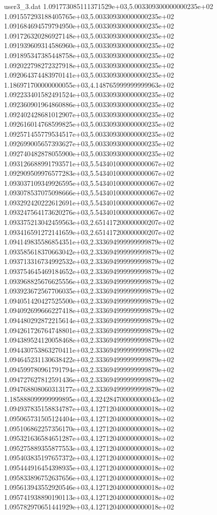 \begin{filecontents}{user3_3.dat}
1.091773085111371529e+03,5.003309300000000235e+02
1.091557293188405765e+03,5.003309300000000235e+02
1.091684694579794950e+03,5.003309300000000235e+02
1.091726320286927148e+03,5.003309300000000235e+02
1.091939609314586960e+03,5.003309300000000235e+02
1.091895347385448758e+03,5.003309300000000235e+02
1.092022798272327918e+03,5.003309300000000235e+02
1.092064374483970141e+03,5.003309300000000235e+02
1.186971700000000055e+03,4.148765999999999963e+02
1.092233401582491524e+03,5.003309300000000235e+02
1.092360901964860886e+03,5.003309300000000235e+02
1.092402428681012907e+03,5.003309300000000235e+02
1.092616014768599825e+03,5.003309300000000235e+02
1.092571455779534517e+03,5.003309300000000235e+02
1.092699005657393627e+03,5.003309300000000235e+02
1.092740482878055900e+03,5.003309300000000235e+02
1.093126688991793571e+03,5.543401000000000067e+02
1.092909509976577283e+03,5.543401000000000067e+02
1.093037109349926595e+03,5.543401000000000067e+02
1.093078537075098666e+03,5.543401000000000067e+02
1.093292420222612691e+03,5.543401000000000067e+02
1.093247564173620276e+03,5.543401000000000067e+02
1.093375213042459563e+03,2.651417200000000207e+02
1.093416591272141659e+03,2.651417200000000207e+02
1.094149835586854351e+03,2.333694999999999879e+02
1.093585618370663042e+03,2.333694999999999879e+02
1.093713316734992532e+03,2.333694999999999879e+02
1.093754645469184652e+03,2.333694999999999879e+02
1.093968825676625556e+03,2.333694999999999879e+02
1.093923672567706035e+03,2.333694999999999879e+02
1.094051420427525500e+03,2.333694999999999879e+02
1.094092699666227418e+03,2.333694999999999879e+02
1.094480292872215614e+03,2.333694999999999879e+02
1.094261726764748801e+03,2.333694999999999879e+02
1.094389524120058468e+03,2.333694999999999879e+02
1.094430753863270411e+03,2.333694999999999879e+02
1.094645231130638422e+03,2.333694999999999879e+02
1.094599780961791794e+03,2.333694999999999879e+02
1.094727627812591436e+03,2.333694999999999879e+02
1.094768808060313177e+03,2.333694999999999879e+02
1.185888099999999895e+03,4.324284700000000043e+02
1.094937835158834787e+03,4.127120400000000018e+02
1.095065731505124404e+03,4.127120400000000018e+02
1.095106862257356170e+03,4.127120400000000018e+02
1.095321636584651287e+03,4.127120400000000018e+02
1.095275889355877553e+03,4.127120400000000018e+02
1.095403835197657372e+03,4.127120400000000018e+02
1.095444916454398935e+03,4.127120400000000018e+02
1.095833896752637656e+03,4.127120400000000018e+02
1.095613943552920546e+03,4.127120400000000018e+02
1.095741938890190113e+03,4.127120400000000018e+02
1.095782970651441929e+03,4.127120400000000018e+02

\end{filecontents}
